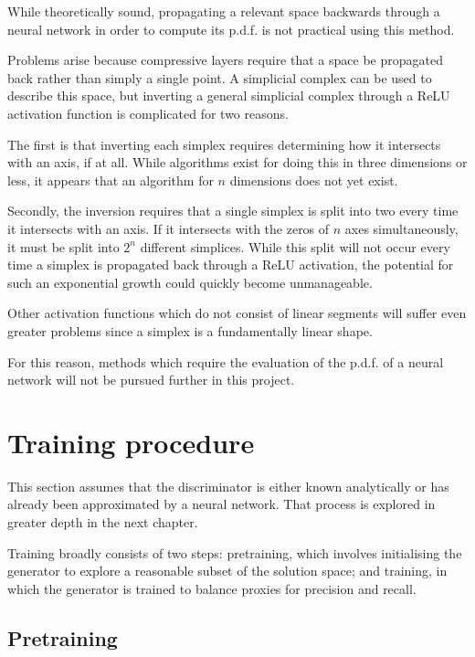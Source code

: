 \documentclass[../../main.tex]{subfiles}
\begin{document}
While theoretically sound, propagating a relevant space backwards through a neural network in order to compute its p.d.f. is not practical using this method.

Problems arise because compressive layers require that a space be propagated back rather than simply a single point.
A simplicial complex can be used to describe this space, but inverting a general simplicial complex through a ReLU activation function is complicated for two reasons.

The first is that inverting each simplex requires determining how it intersects with an axis, if at all.
While algorithms exist for doing this in three dimensions or less, it appears that an algorithm for $n$ dimensions does not yet exist.

Secondly, the inversion requires that a single simplex is split into two every time it intersects with an axis.
If it intersects with the zeros of $n$ axes simultaneously, it must be split into $2^n$ different simplices.
While this split will not occur every time a simplex is propagated back through a ReLU activation, the potential for such an exponential growth could quickly become unmanageable.

Other activation functions which do not consist of linear segments will suffer even greater problems since a simplex is a fundamentally linear shape.

For this reason, methods which require the evaluation of the p.d.f. of a neural network will not be pursued further in this project.

\section{Training procedure} \label{section:generatorTrainingProcedure}

This section assumes that the discriminator is either known analytically or has already been approximated by a neural network.
That process is explored in greater depth in the next chapter.

Training broadly consists of two steps: pretraining, which involves initialising the generator to explore a reasonable subset of the solution space; and training, in which the generator is trained to balance proxies for precision and recall.

\subsection{Pretraining} \label{subsection:pretraining}
\end{document}
